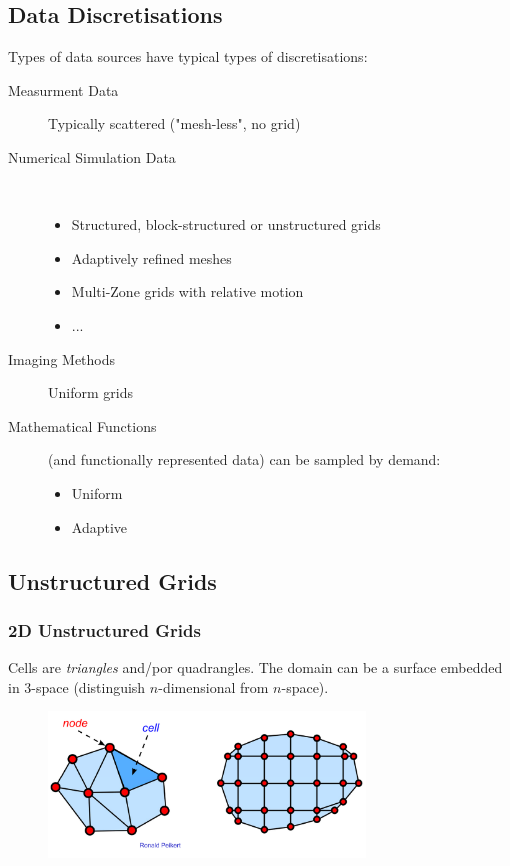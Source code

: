 \subsection{Data Discretisations}
Types of data sources have typical types of discretisations:
\begin{description}
\item[Measurment Data] Typically scattered ("mesh-less", no grid)
\item[Numerical Simulation Data] $\ $
    \begin{itemize}
        \item Structured, block-structured or unstructured grids
        \item Adaptively refined meshes
        \item Multi-Zone grids with relative motion
        \item ...
    \end{itemize}
\item[Imaging Methods] Uniform grids
\item[Mathematical Functions] (and functionally represented data) can be sampled by demand:
    \begin{itemize}
        \item Uniform
        \item Adaptive
    \end{itemize}
\end{description}

\subsection{Unstructured Grids}
\subsubsection{2D Unstructured Grids}
Cells are \emph{triangles} and/por quadrangles. The domain can be a surface embedded in $3$-space (distinguish $n$-dimensional from $n$-space).
\begin{figure}[H]
\centering   
\includegraphics[width=0.75\textwidth]{img/01_unstructured_grids}
\end{figure}

